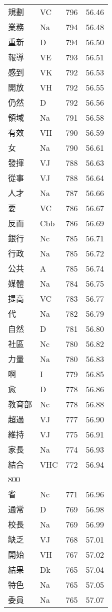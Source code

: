 \documentclass[twocolumn]{book}
\begin{document}
\begin{supertabular}{llrr}
規劃 & VC & 796 &  56.46\\
業務 & Na & 794 &  56.48\\
重新 & D & 794 &  56.50\\
報導 & VE & 793 &  56.51\\
感到 & VK & 792 &  56.53\\
開放 & VH & 792 &  56.55\\
仍然 & D & 792 &  56.56\\
領域 & Na & 791 &  56.58\\
有效 & VH & 790 &  56.59\\
女 & Na & 790 &  56.61\\
發揮 & VJ & 788 &  56.63\\
從事 & VJ & 788 &  56.64\\
人才 & Na & 787 &  56.66\\
要 & VC & 786 &  56.67\\
反而 & Cbb & 786 &  56.69\\
銀行 & Nc & 785 &  56.71\\
行政 & Na & 785 &  56.72\\
公共 & A & 785 &  56.74\\
媒體 & Na & 784 &  56.75\\
提高 & VC & 783 &  56.77\\
代 & Na & 782 &  56.79\\
自然 & D & 781 &  56.80\\
社區 & Nc & 780 &  56.82\\
力量 & Na & 780 &  56.83\\
啊 & I & 779 &  56.85\\
愈 & D & 778 &  56.86\\
教育部 & Nc & 778 &  56.88\\
超過 & VJ & 777 &  56.90\\
維持 & VJ & 775 &  56.91\\
家長 & Na & 774 &  56.93\\
結合 & VHC & 772 &  56.94\\
800\\
省 & Nc & 771 &  56.96\\
通常 & D & 769 &  56.98\\
校長 & Na & 769 &  56.99\\
缺乏 & VJ & 768 &  57.01\\
開始 & VH & 767 &  57.02\\
結果 & Dk & 765 &  57.04\\
特色 & Na & 765 &  57.05\\
委員 & Na & 765 &  57.07\\

\end{supertabular}
\end{document}

